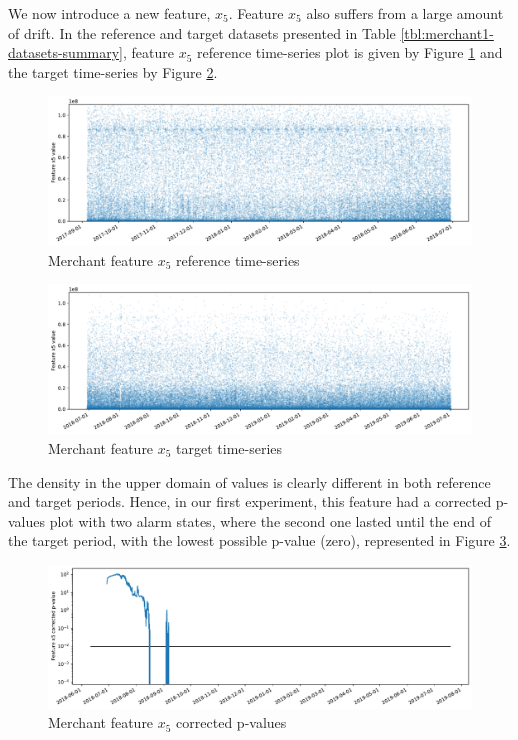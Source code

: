 We now introduce a new feature, $x_5$. Feature $x_5$ also suffers from a large amount of drift. In the reference and target datasets presented in Table \ref{tbl:merchant1-datasets-summary}, feature $x_5$ reference time-series plot is given by Figure \ref{fig:merchant-x5-reference} and the target time-series by Figure \ref{fig:merchant-x5-target}.
\begin{figure}[!htb]
    \begin{center}
      \includegraphics[scale=0.5]{figures/merchant-x5-reference.pdf}
      \caption{Merchant feature $x_5$ reference time-series}
      \label{fig:merchant-x5-reference}
    \end{center}
\end{figure}
\begin{figure}[!htb]
    \begin{center}
      \includegraphics[scale=0.5]{figures/merchant-x5-target.pdf}
      \caption{Merchant feature $x_5$ target time-series}
      \label{fig:merchant-x5-target}
    \end{center}
\end{figure}
The density in the upper domain of values is clearly different in both reference and target periods. Hence, in our first experiment, this feature had a corrected p-values plot with two alarm states, where the second one lasted until the end of the target period, with the lowest possible p-value (zero), represented in Figure \ref{fig:merchant-x5-correctedpvalues}.
\begin{figure}[!htb]
    \begin{center}
      \includegraphics[scale=0.5]{figures/merchant-x5-correctedpvalues.pdf}
      \caption{Merchant feature $x_5$ corrected p-values}
      \label{fig:merchant-x5-correctedpvalues}
    \end{center}
\end{figure}

